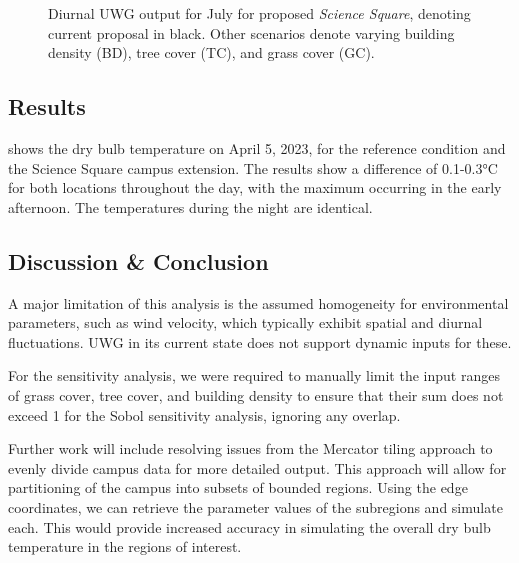 \documentclass[a4paper, 12pt]{article}
\begin{document}
\begin{figure}[tbhp]
\begin{minipage}[b]{0.49\textwidth}
        \caption{Diurnal UWG output for July for proposed \textit{Science Square}, denoting current proposal in black. Other scenarios denote varying building density (BD), tree cover (TC), and grass cover (GC).}
        \label{fig:comparing-epw}
    \end{minipage}
\end{figure}

\subsection*{Results}

 shows the dry bulb temperature on April 5, 2023, for the reference condition and the Science Square campus extension. 
The results show a difference of 0.1-0.3°C for both locations throughout the day, with the maximum occurring in the early afternoon.
The temperatures during the night are identical.


\enlargethispage{1cm}

\subsection*{Discussion \& Conclusion} 

A major limitation of this analysis is the assumed homogeneity for environmental parameters, such as wind velocity, which typically exhibit spatial and diurnal fluctuations. UWG in its current state does not support dynamic inputs for these.

For the sensitivity analysis, we were required to manually limit the input ranges of grass cover, tree cover, and building density to ensure that their sum does not exceed 1 for the Sobol sensitivity analysis, ignoring any overlap.

Further work will include resolving issues from the Mercator tiling approach to evenly divide campus data for more detailed output. 
This approach will allow for partitioning of the campus into subsets of bounded regions. 
Using the edge coordinates, we can retrieve the parameter values of the subregions and simulate each. 
This would provide increased accuracy in simulating the overall dry bulb temperature in the regions of interest.


\enlargethispage{1cm}


\footnotesize
\scriptsize

\end{document}
